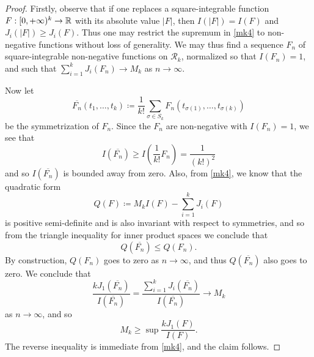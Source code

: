 \begin{proof}  Firstly, observe that if one replaces a square-integrable function $F: [0,+\infty)^k \to \mathbb{R}$ with its absolute value $|F|$, then $I(|F|) = I(F)$ and $J_i(|F|) \geq J_i(F)$.  Thus one may restrict the supremum in \eqref{mk4} to non-negative functions without loss of generality.  We may thus find a sequence $F_n$ of square-integrable non-negative functions on ${\mathcal R}_k$, normalized so that $I(F_n)=1$, and such that $\sum_{i=1}^k J_i(F_n) \to M_k$ as $n \to \infty$.

Now let
$$\overline{F_n}(t_1,\dots,t_k) \coloneqq \frac{1}{k!} \sum_{\sigma \in S_k} F_n( t_{\sigma(1)},\dots,t_{\sigma(k)} )$$
be the symmetrization of $F_n$.  Since the $F_n$ are non-negative with $I(F_n)=1$, we see that
$$ I( \overline{F_n} ) \geq I( \frac{1}{k!} F_n ) = \frac{1}{(k!)^2}$$
and so $I(\overline{F_n})$ is bounded away from zero.  Also, from \eqref{mk4}, we know that the quadratic form
$$ Q(F) \coloneqq M_k I(F) - \sum_{i=1}^k J_i(F)$$
is positive semi-definite and is also invariant with respect to symmetries, and so from the triangle inequality for inner product spaces we conclude that
$$ Q( \overline{F_n} ) \leq Q( F_n ).$$
By construction, $Q(F_n)$ goes to zero as $n \to \infty$, and thus $Q(\overline{F_n})$ also goes to zero.  We conclude that
$$ \frac{k J_1(\overline{F_n})}{I(\overline{F_n})} = \frac{\sum_{i=1}^k J_i(\overline{F_n})}{I(\overline{F_n})} \to M_k$$
as $n \to \infty$, and so
$$ M_k \geq \sup \frac{k J_1(F)}{I(F)}.$$
The reverse inequality is immediate from \eqref{mk4}, and the claim follows.
\end{proof}

